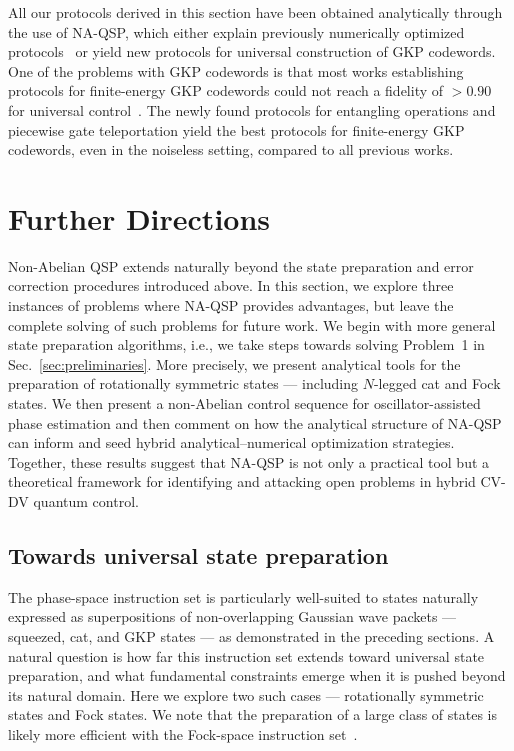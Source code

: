 \documentclass[aps,prx,showpacs,notitlepage,twocolumn,superscriptaddress,nofootinbib,preprintnumbers,floatfix,10pt, longbibliography]{revtex4-2}
\begin{document}
All our protocols derived in this section have been obtained analytically through the use of NA-QSP, which either explain previously numerically optimized protocols~\cite{hastrup2021improved,hastrup2021unconditional,hastrup2021measurement,hastrup2023analysis} or yield new protocols for universal construction of GKP codewords. One of the problems with GKP codewords is that most works establishing protocols for finite-energy GKP codewords could not reach a fidelity of $>0.90$ for universal control~\cite{rojkov2023two,hastrup2021unsuitability}. The newly found protocols for entangling operations and piecewise gate teleportation yield the best protocols for finite-energy GKP codewords, even in the noiseless setting, compared to all previous works.
\section{Further Directions}\label{sec:conc}
Non-Abelian QSP extends naturally beyond the state preparation and error 
correction procedures introduced above. In this section, we explore three instances of problems where NA-QSP provides advantages, but leave the complete solving of such problems for future work.
We begin with more general state preparation algorithms, i.e., we take steps towards solving Problem~1 in Sec.~\ref{sec:preliminaries}. More precisely, we present analytical tools for the preparation of 
rotationally symmetric states — including $N$-legged cat and Fock states.  We then present a non-Abelian control 
sequence for oscillator-assisted phase estimation and then comment on 
how the analytical structure of NA-QSP can inform and seed hybrid 
analytical--numerical optimization strategies.  Together, 
these results suggest that NA-QSP is not only a practical tool but a 
theoretical framework for identifying and attacking open problems in 
hybrid CV-DV quantum control.
\subsection{Towards universal state preparation}\label{ssec:universal}

The phase-space instruction set is particularly well-suited to states naturally expressed as superpositions of non-overlapping Gaussian wave packets — squeezed, cat, and GKP states — as demonstrated in
the preceding sections.  A natural question is how far this instruction set
extends toward universal state preparation, and what fundamental constraints
emerge when it is pushed beyond its natural domain.  Here we explore two
such cases — rotationally symmetric states and Fock states.  We note that the preparation of a large class of states is likely more efficient with the Fock-space instruction set~\cite{ISA,fong2025engineeringnongaussianbosonicgates}.
\end{document}
